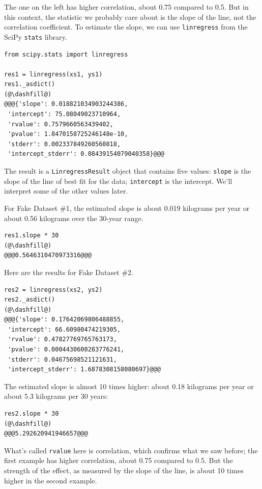 The one on the left has higher correlation, about 0.75 compared to 0.5.
But in this context, the statistic we probably care about is the slope
of the line, not the correlation coefficient. To estimate the slope, we
can use \passthrough{\lstinline!linregress!} from the SciPy
\passthrough{\lstinline!stats!} library.

\begin{lstlisting}[]
from scipy.stats import linregress

res1 = linregress(xs1, ys1)
res1._asdict()
(@\dashfill@)
@@@{'slope': 0.018821034903244386,
 'intercept': 75.08049023710964,
 'rvalue': 0.7579660563439402,
 'pvalue': 1.8470158725246148e-10,
 'stderr': 0.002337849260560818,
 'intercept_stderr': 0.08439154079040358}@@@
\end{lstlisting}

The result is a \passthrough{\lstinline!LinregressResult!} object that
contains five values: \passthrough{\lstinline!slope!} is the slope of
the line of best fit for the data; \passthrough{\lstinline!intercept!}
is the intercept. We'll interpret some of the other values later.

For Fake Dataset \#1, the estimated slope is about 0.019 kilograms per
year or about 0.56 kilograms over the 30-year range.

\begin{lstlisting}[]
res1.slope * 30
(@\dashfill@)
@@@0.5646310470973316@@@
\end{lstlisting}

Here are the results for Fake Dataset \#2.

\begin{lstlisting}[]
res2 = linregress(xs2, ys2)
res2._asdict()
(@\dashfill@)
@@@{'slope': 0.17642069806488855,
 'intercept': 66.60980474219305,
 'rvalue': 0.47827769765763173,
 'pvalue': 0.0004430600283776241,
 'stderr': 0.04675698521121631,
 'intercept_stderr': 1.6878308158080697}@@@
\end{lstlisting}

The estimated slope is almost 10 times higher: about 0.18 kilograms per
year or about 5.3 kilograms per 30 years:

\begin{lstlisting}[]
res2.slope * 30
(@\dashfill@)
@@@5.292620941946657@@@
\end{lstlisting}

What's called \passthrough{\lstinline!rvalue!} here is correlation,
which confirms what we saw before; the first example has higher
correlation, about 0.75 compared to 0.5. But the strength of the effect,
as measured by the slope of the line, is about 10 times higher in the
second example.

